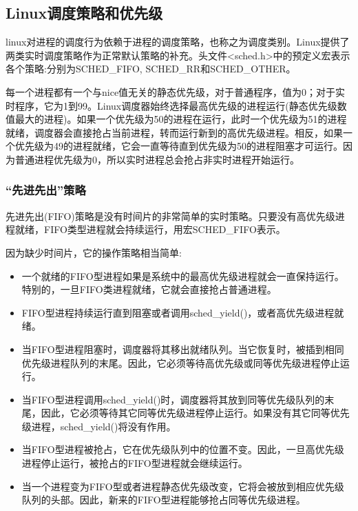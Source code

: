 \subsection{Linux调度策略和优先级}

  linux对进程的调度行为依赖于进程的调度策略，也称之为调度类别。Linux提供了两类实时调度策略作为正常默认策略的补充。头文件<sched.h>中的预定义宏表示各个策略:分别为SCHED\_FIFO, SCHED\_RR和SCHED\_OTHER。

  每一个进程都有一个与nice值无关的静态优先级，对于普通程序，值为0；对于实时程序，它为1到99。Linux调度器始终选择最高优先级的进程运行(静态优先级数值最大的进程)。如果一个优先级为50的进程在运行，此时一个优先级为51的进程就绪，调度器会直接抢占当前进程，转而运行新到的高优先级进程。相反，如果一个优先级为49的进程就绪，它会一直等待直到优先级为50的进程阻塞才可运行。因为普通进程优先级为0，所以实时进程总会抢占非实时进程开始运行。

\subsubsection{“先进先出”策略}

  先进先出(FIFO)策略是没有时间片的非常简单的实时策略。只要没有高优先级进程就绪，FIFO类型进程就会持续运行，用宏SCHED\_FIFO表示。

  因为缺少时间片，它的操作策略相当简单:

\begin{itemize}
\item \begin{flushleft}一个就绪的FIFO型进程如果是系统中的最高优先级进程就会一直保持运行。特别的，一旦FIFO类进程就绪，它就会直接抢占普通进程。\end{flushleft}
\item \begin{flushleft}FIFO型进程持续运行直到阻塞或者调用sched\_yield()，或者高优先级进程就绪。\end{flushleft}
\item \begin{flushleft}当FIFO型进程阻塞时，调度器将其移出就绪队列。当它恢复时，被插到相同优先级进程队列的末尾。因此，它必须等待高优先级或同等优先级进程停止运行。\end{flushleft}
\item \begin{flushleft}当FIFO型进程调用sched\_yield()时，调度器将其放到同等优先级队列的末尾，因此，它必须等待其它同等优先级进程停止运行。如果没有其它同等优先级进程，sched\_yield()将没有作用。\end{flushleft}
\item \begin{flushleft}当FIFO型进程被抢占，它在优先级队列中的位置不变。因此，一旦高优先级进程停止运行，被抢占的FIFO型进程就会继续运行。\end{flushleft}
\item \begin{flushleft}当一个进程变为FIFO型或者进程静态优先级改变，它将会被放到相应优先级队列的头部。因此，新来的FIFO型进程能够抢占同等优先级进程。\end{flushleft}
\end{itemize}

